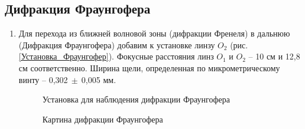 \documentclass[a4paper, 12pt]{article}
\begin{document}
\subsection{Дифракция Фраунгофера}

\begin{enumerate}
	\item Для перехода из ближней волновой зоны (дифракции Френеля) в дальнюю (Дифракция Фраунгофера) добавим к установке линзу $O_2$ (рис. \ref{Установка_Фраунгофер}). Фокусные расстояния линз $O_1$ и $O_2$ -- 10 см и 12,8 см соответственно. Ширина щели, определенная по микрометрическому винту -- 0,302$~\pm~$0,005 мм.

\clearpage
	\begin{figure}[h!]
	\begin{minipage}{1\textwidth}
		\caption{Установка для наблюдения дифракции Фраунгофера}
	\end{minipage}
	\begin{minipage}{1\textwidth}
		\caption{Картина дифракции Фраунгофера}
	\end{minipage}
	\end{figure}


\end{enumerate}
\end{document}

